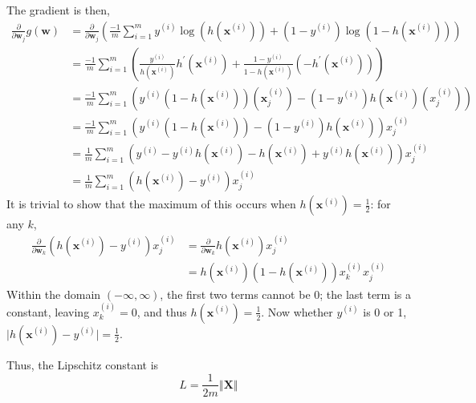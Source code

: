 \documentclass[sigconf,authordraft]{acmart}
\begin{document}
The gradient is then,
\[
    \begin{aligned} \frac{\partial}{\partial \textbf{w}_j} g(\textbf{w}) &= \frac{\partial}{\partial \textbf{w}_j} \left( \frac{-1}{m} \sum_{i = 1}^m y^{(i)} \log \left( h(\textbf{x}^{(i)}) \right) + (1 - y^{(i)}) \log \left( 1 - h(\textbf{x}^{(i)}) \right) \right) \\ 
    &= \frac{-1}{m} \sum_{i = 1}^m \left( \frac{y^{(i)}}{h(\textbf{x}^{(i)})}h^{\prime}(\textbf{x}^{(i)}) + \frac{1 - y^{(i)}}{1 - h(\textbf{x}^{(i)})}(-h^{\prime}(\textbf{x}^{(i)})) \right) \\ 
    &= \frac{-1}{m} \sum_{i = 1}^m \left( y^{(i)}(1 - h(\textbf{x}^{(i)}))(\textbf{x}^{(i)}_j) - (1 - y^{(i)})h(\textbf{x}^{(i)})(x^{(i)}_j) \right) \\ 
    &= \frac{-1}{m} \sum_{i = 1}^m \left( y^{(i)}(1 - h(\textbf{x}^{(i)})) - (1 - y^{(i)})h(\textbf{x}^{(i)}) \right)x^{(i)}_j \\ 
    &= \frac{1}{m} \sum_{i = 1}^m \left( y^{(i)} - y^{(i)}h(\textbf{x}^{(i)}) - h(\textbf{x}^{(i)}) + y^{(i)}h(\textbf{x}^{(i)}) \right)x^{(i)}_j \\ 
    &= \frac{1}{m} \sum_{i = 1}^m \left( h(\textbf{x}^{(i)}) - y^{(i)} \right)x^{(i)}_j \end{aligned}
\]
It is trivial to show that the maximum of this occurs when $h(\textbf{x}^{(i)})=\frac{1}{2}$: for any $k$,
\[
    \begin{aligned}
        \frac{\partial}{\partial \textbf{w}_k} \left( h(\textbf{x}^{(i)}) - y^{(i)} \right)x^{(i)}_j &= \frac{\partial}{\partial \textbf{w}_k} h(\textbf{x}^{(i)})x^{(i)}_j \\
        &= h(\textbf{x}^{(i)})\left(1-h(\textbf{x}^{(i)}) \right)x^{(i)}_k x^{(i)}_j
    \end{aligned}
\]
Within the domain $(-\infty, \infty)$, the first two terms cannot be 0; the last term is a constant, leaving $x^{(i)}_k = 0$, and thus $h(\textbf{x}^{(i)}) = \frac{1}{2}$. Now whether $y^{(i)}$  is 0 or 1, $\lvert h(\textbf{x}^{(i)}) - y^{(i)} \rvert = \frac{1}{2}$.

Thus, the Lipschitz constant is
\[
    \boxed{
        L = \frac{1}{2m} \left\Vert \textbf{X} \right\Vert
    }
\]
\end{document}

